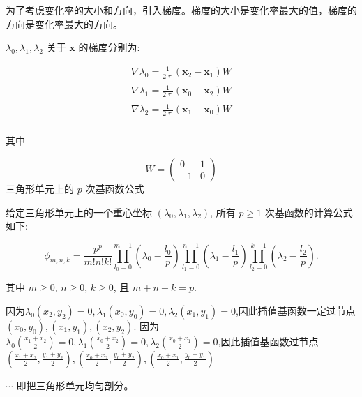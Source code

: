 \documentclass{article}
\begin{document}
为了考虑变化率的大小和方向，引入梯度。梯度的大小是变化率最大的值，梯度的方向是变化率最大的方向。

$\lambda_0, \lambda_1, \lambda_2$ 关于 $\mathbf x$ 的梯度分别为:

$$
\begin{aligned}
\nabla\lambda_0 = \frac{1}{2|\tau|}(\mathbf x_2 - \mathbf x_1)W\\
\nabla\lambda_1 = \frac{1}{2|\tau|}(\mathbf x_0 - \mathbf x_2)W\\
\nabla\lambda_2 = \frac{1}{2|\tau|}(\mathbf x_1 - \mathbf x_0)W\\
\end{aligned}
$$

其中 

$$
W = \begin{pmatrix}
0 & 1\\ -1 & 0 
\end{pmatrix}
$$
三角形单元上的 $p$ 次基函数公式

给定三角形单元上的一个重心坐标 $(\lambda_0, \lambda_1, \lambda_2)$, 所有 $p\geq 1$ 次基函数的计算公式如下:

$$
\phi_{m,n,k} = \frac{p^p}{m!n!k!}\prod_{l_0 = 0}^{m - 1}
(\lambda_0 - \frac{l_0}{p}) \prod_{l_1 = 0}^{n-1}(\lambda_1 -
\frac{l_1}{p}) \prod_{l_2=0}^{k-1}(\lambda_2 - \frac{l_2}{p}).
$$

其中 $ m\geq 0$, $n\geq 0$, $ k \geq 0$, 且 $m+n+k=p$.

因为$\lambda_0 (x_2,y_2) = 0,\lambda_1 (x_0,y_0) = 0,\lambda_2 (x_1,y_1) = 0$,因此插值基函数一定过节点$(x_0,y_0),(x_1,y_1),(x_2,y_2).$
因为$\lambda_0 (\frac{x_1+x_2}{2}) = 0,\lambda_1 (\frac{x_0+x_2}{2}) = 0,\lambda_2 (\frac{x_0+x_1}{2}) = 0$,因此插值基函数过节点$(\frac{x_1+x_2}{2},\frac{y_1+y_2}{2}),(\frac{x_0+x_2}{2},\frac{y_0+y_2}{2}),(\frac{x_0+x_1}{2},\frac{y_0+y_1}{2})$

$\cdots$
即把三角形单元均匀剖分。




















\newpage
\nocite{*}

\end{document}
